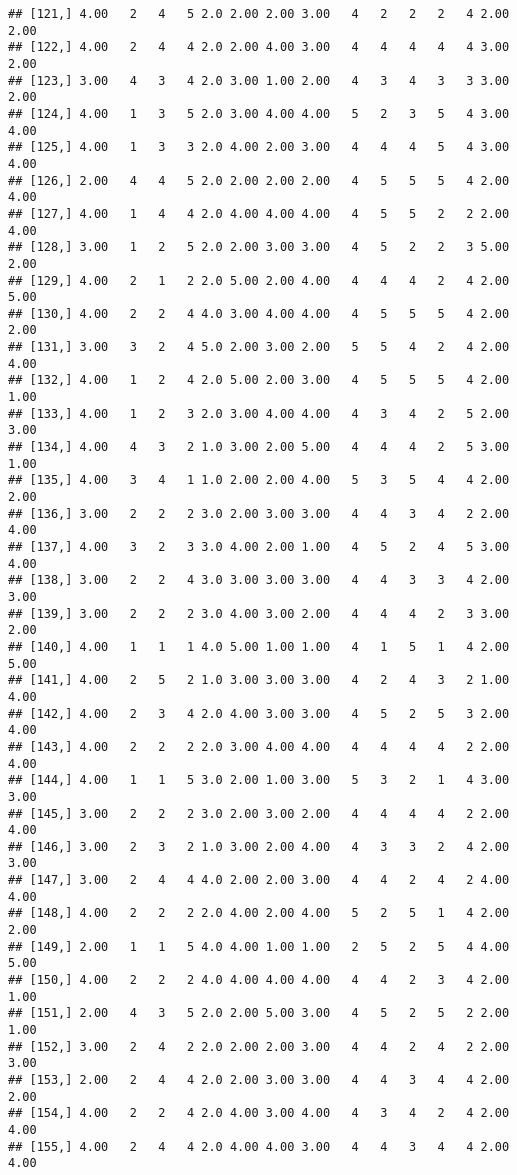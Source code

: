 \documentclass[]{article}
\begin{document}
\begin{verbatim}
## [121,] 4.00   2   4   5 2.0 2.00 2.00 3.00   4   2   2   2   4 2.00 2.00
## [122,] 4.00   2   4   4 2.0 2.00 4.00 3.00   4   4   4   4   4 3.00 2.00
## [123,] 3.00   4   3   4 2.0 3.00 1.00 2.00   4   3   4   3   3 3.00 2.00
## [124,] 4.00   1   3   5 2.0 3.00 4.00 4.00   5   2   3   5   4 3.00 4.00
## [125,] 4.00   1   3   3 2.0 4.00 2.00 3.00   4   4   4   5   4 3.00 4.00
## [126,] 2.00   4   4   5 2.0 2.00 2.00 2.00   4   5   5   5   4 2.00 4.00
## [127,] 4.00   1   4   4 2.0 4.00 4.00 4.00   4   5   5   2   2 2.00 4.00
## [128,] 3.00   1   2   5 2.0 2.00 3.00 3.00   4   5   2   2   3 5.00 2.00
## [129,] 4.00   2   1   2 2.0 5.00 2.00 4.00   4   4   4   2   4 2.00 5.00
## [130,] 4.00   2   2   4 4.0 3.00 4.00 4.00   4   5   5   5   4 2.00 2.00
## [131,] 3.00   3   2   4 5.0 2.00 3.00 2.00   5   5   4   2   4 2.00 4.00
## [132,] 4.00   1   2   4 2.0 5.00 2.00 3.00   4   5   5   5   4 2.00 1.00
## [133,] 4.00   1   2   3 2.0 3.00 4.00 4.00   4   3   4   2   5 2.00 3.00
## [134,] 4.00   4   3   2 1.0 3.00 2.00 5.00   4   4   4   2   5 3.00 1.00
## [135,] 4.00   3   4   1 1.0 2.00 2.00 4.00   5   3   5   4   4 2.00 2.00
## [136,] 3.00   2   2   2 3.0 2.00 3.00 3.00   4   4   3   4   2 2.00 4.00
## [137,] 4.00   3   2   3 3.0 4.00 2.00 1.00   4   5   2   4   5 3.00 4.00
## [138,] 3.00   2   2   4 3.0 3.00 3.00 3.00   4   4   3   3   4 2.00 3.00
## [139,] 3.00   2   2   2 3.0 4.00 3.00 2.00   4   4   4   2   3 3.00 2.00
## [140,] 4.00   1   1   1 4.0 5.00 1.00 1.00   4   1   5   1   4 2.00 5.00
## [141,] 4.00   2   5   2 1.0 3.00 3.00 3.00   4   2   4   3   2 1.00 4.00
## [142,] 4.00   2   3   4 2.0 4.00 3.00 3.00   4   5   2   5   3 2.00 4.00
## [143,] 4.00   2   2   2 2.0 3.00 4.00 4.00   4   4   4   4   2 2.00 4.00
## [144,] 4.00   1   1   5 3.0 2.00 1.00 3.00   5   3   2   1   4 3.00 3.00
## [145,] 3.00   2   2   2 3.0 2.00 3.00 2.00   4   4   4   4   2 2.00 4.00
## [146,] 3.00   2   3   2 1.0 3.00 2.00 4.00   4   3   3   2   4 2.00 3.00
## [147,] 3.00   2   4   4 4.0 2.00 2.00 3.00   4   4   2   4   2 4.00 4.00
## [148,] 4.00   2   2   2 2.0 4.00 2.00 4.00   5   2   5   1   4 2.00 2.00
## [149,] 2.00   1   1   5 4.0 4.00 1.00 1.00   2   5   2   5   4 4.00 5.00
## [150,] 4.00   2   2   2 4.0 4.00 4.00 4.00   4   4   2   3   4 2.00 1.00
## [151,] 2.00   4   3   5 2.0 2.00 5.00 3.00   4   5   2   5   2 2.00 1.00
## [152,] 3.00   2   4   2 2.0 2.00 2.00 3.00   4   4   2   4   2 2.00 3.00
## [153,] 2.00   2   4   4 2.0 2.00 3.00 3.00   4   4   3   4   4 2.00 2.00
## [154,] 4.00   2   2   4 2.0 4.00 3.00 4.00   4   3   4   2   4 2.00 4.00
## [155,] 4.00   2   4   4 2.0 4.00 4.00 3.00   4   4   3   4   4 2.00 4.00

\end{verbatim}
\end{document}
